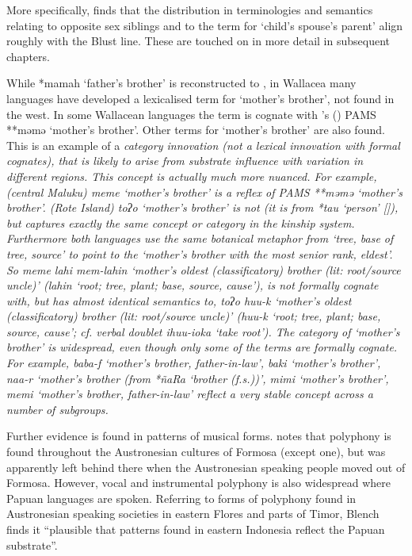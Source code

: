 More specifically, \citet{Fox2015} finds that the distribution
in terminologies and semantics relating to opposite sex siblings
and to the term for `child’s spouse’s parent' align roughly with the Blust line.
These are touched on in more detail in subsequent chapters.

While *mamah ‘father’s brother’ is reconstructed to ,
in Wallacea many languages have developed a lexicalised term
for ‘mother’s brother’, not found in the west.
In some Wallacean languages the term is cognate with
\citeauthor{Stresemann1927}'s (\citeyear{Stresemann1927}) PAMS **məmə ‘mother’s brother’.
Other terms for ‘mother’s brother’ are also found.
This is an example of a \it{category innovation} (not a lexical
innovation with formal cognates),
that is likely to arise from substrate influence with variation in different regions.
This concept is actually much more nuanced.
For example,  (central Maluku) \it{meme} ‘mother’s brother’
is a reflex of PAMS **məmə ‘mother’s brother’.
 (Rote Island) \it{toʔo} ‘mother’s brother’ is not (it is
from *tau ‘person’ [\citealp[370]{Edwards2021}]),
but captures exactly the same concept or category in the kinship system.
Furthermore both languages use the same botanical metaphor from
‘tree, base of tree, source’ to point to the ‘mother’s brother with
the most senior rank, eldest’.
So  \it{meme lahi {\tl} mem-lahin} ‘mother’s oldest (classificatory)
brother (lit: root/source uncle)’ (\it{lahin} ‘root; tree,
plant; base, source, cause’), is not formally cognate with,
but has almost identical semantics to,
 \it{toʔo huu-k} ‘mother’s oldest (classificatory) brother
(lit: root/source uncle)’ (\it{huu-k} ‘root; tree,
plant; base, source, cause’; cf.
verbal doublet \it{ihuu-ioka} ‘take root’).
The category of ‘mother’s brother’ is widespread,
even though only some of the terms are formally cognate.
For example,  \it{baba-f} ‘mother’s brother,
father-in-law’,  \it{baki} ‘mother’s brother’,
 \it{naa-r} ‘mother’s brother (from *ñaRa ‘brother (f.s.))’,
 \it{mimi} ‘mother’s brother’,
 \it{memi} ‘mother’s brother,
father-in-law’ reflect a very stable concept across a number of subgroups.

Further evidence is found in patterns of musical forms.
\citet{Blench2021} notes that polyphony is found throughout the
Austronesian cultures of Formosa (except one),
but was apparently left behind there when the Austronesian speaking
people moved out of Formosa.
However, vocal and instrumental polyphony is also widespread
where Papuan languages are spoken.
Referring to forms of polyphony found in Austronesian speaking
societies in eastern Flores
and parts of Timor,
Blench finds it “plausible that patterns found in eastern Indonesia
reflect the Papuan substrate”.

